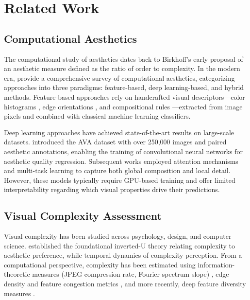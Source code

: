 
\section{Related Work}
\label{sec:related}

\subsection{Computational Aesthetics}
\label{sec:rw_aesthetics}

The computational study of aesthetics dates back to Birkhoff's \citep{birkhoff1933aesthetic} early proposal of an aesthetic measure defined as the ratio of order to complexity. In the modern era, \citet{damasio2022visual} provide a comprehensive survey of computational aesthetics, categorizing approaches into three paradigms: feature-based, deep learning-based, and hybrid methods. Feature-based approaches rely on handcrafted visual descriptors---color histograms \citep{freuder2001color}, edge orientations \citep{iyer2012detecting}, and compositional rules \citep{mavridaki2015composit}---extracted from image pixels and combined with classical machine learning classifiers.

Deep learning approaches have achieved state-of-the-art results on large-scale datasets. \citet{murray2012ava} introduced the AVA dataset with over 250,000 images and paired aesthetic annotations, enabling the training of convolutional neural networks for aesthetic quality regression. Subsequent works \citep{jin2020aesthetic, zhu2022meta} employed attention mechanisms and multi-task learning to capture both global composition and local detail. However, these models typically require GPU-based training and offer limited interpretability regarding which visual properties drive their predictions.

\subsection{Visual Complexity Assessment}
\label{sec:rw_complexity}

Visual complexity has been studied across psychology, design, and computer science. \citet{berlyne1971aesthetics} established the foundational inverted-U theory relating complexity to aesthetic preference, while \citet{nadal2010exploring}temporal dynamics of complexity perception. From a computational perspective, complexity has been estimated using information-theoretic measures (JPEG compression rate, Fourier spectrum slope) \citep{forsythe2011predicting}, edge density and feature congestion metrics \citep{rosenholtz2007measuring}, and more recently, deep feature diversity measures \citep{perez2022deep}.

